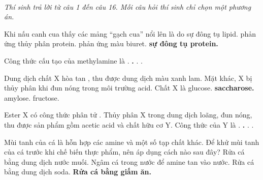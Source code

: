 \documentclass[11pt,a4paper]{article}
\begin{document}
 \\
\textit{Thí sinh trả lời từ câu 1 đến câu 16. Mỗi câu hỏi thí sinh chỉ chọn một phương án.}
\vspace{4pt}
\begin{ex}
Khi nấu canh cua thấy các mảng ``gạch cua'' nổi lên là do
\choice
{sự đông tụ lipid.}
{phản ứng thủy phân protein.}
{phản ứng màu biuret.}
{\textbf{\color{hfRed}sự đông tụ protein.}}
\end{ex}
\begin{ex}
Công thức cấu tạo của methylamine là
\choice
{.}
{\textbf{\color{hfRed}.}}
{.}
{.}
\end{ex}
\begin{ex}
Dung dịch chất X hòa tan , thu được dung dịch màu xanh lam. Mặt khác, X bị thủy phân khi đun nóng trong môi trường acid. Chất X là
\choice
{glucose.}
{\textbf{\color{hfRed}saccharose.}}
{amylose.}
{fructose.}
\end{ex}
\begin{ex}
Ester X có công thức phân tử . Thủy phân X trong dung dịch  loãng, đun nóng, thu được sản phẩm gồm acetic acid và chất hữu cơ Y. Công thức của Y là
\choice
{.}
{\textbf{\color{hfRed}.}}
{.}
{.}
\end{ex}
\begin{ex}
Mùi tanh của cá là hỗn hợp các amine và một số tạp chất khác. Để khử mùi tanh của cá trước khi chế biến thực phẩm, nên áp dụng cách nào sau đây?
\choice
{Rửa cá bằng dung dịch nước muối.}
{Ngâm cá trong nước để amine tan vào nước.}
{Rửa cá bằng dung dịch soda.}
{\textbf{\color{hfRed}Rửa cá bằng giấm ăn.}}
\end{ex}
\end{document}
